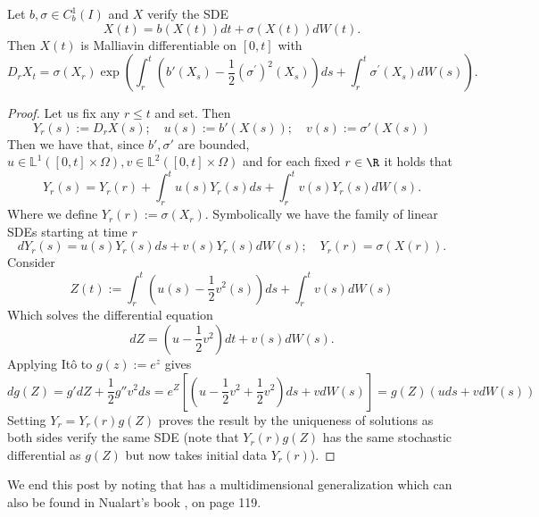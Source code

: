 \documentclass[
    a4paper,
    DIV=14,
    abstract=true,
    numbers=noenddot
]{scrartcl}
\begin{document}
\begin{theorem}
	Let $b,\sigma \in C^1_b(I)$ and $X$ verify  the SDE
	\begin{equation*}
		X(t)=b(X(t))d t +\sigma(X(t)) dW(t).
	\end{equation*}
	Then $X(t)$ is Malliavin differentiable on $[0,t]$ with
	\begin{equation*}
		D_r X_t=\sigma\left(X_r\right) \exp \left(\int_r^t\left(b'\left(X_s\right)-\frac{1}{2}\left(\sigma^{\prime}\right)^2\left(X_s\right)\right) d s+\int_r^t \sigma^{\prime}\left(X_s\right) d W(s)\right).
	\end{equation*}
	\begin{proof}
		Let us fix any $r\leq t$ and set. Then
		\begin{equation*}
			Y_r(s):=D_rX(s);\quad  u(s):=b'(X(s));\quad v(s):=\sigma'(X(s))
		\end{equation*}
		Then we have that, since $b',\sigma '$ are bounded, $u\in \mathbb{L}^1([0,t]\times\Omega),v\in \mathbb{L}^2([0,t]\times\Omega)$ and for each fixed $r\in  \R$ it holds that
		\begin{equation*}
			Y_r(s)=Y_r(r)+\int_{r}^t u(s)Y_r(s) ds+\int_{r}^t v(s)Y_r(s)  dW(s) .
		\end{equation*}
		Where we define $Y_r(r):=\sigma (X_r)$. Symbolically we have the family of linear SDEs starting at time $r$
		\begin{equation*}
			dY_r(s)=u(s)Y_r(s) ds+v(s)Y_r(s)  dW(s);\quad Y_r(r)=\sigma(X(r)).
		\end{equation*}
		Consider
		\begin{equation*}
			Z(t) := \int_r^t\left(u(s)-\frac{1}{2}v^2(s)\right) d s + \int_r^t v(s) d W(s)
		\end{equation*}
		Which solves the differential equation
		\begin{equation*}
			dZ=\left(u-\frac{1}{2}v^2\right)d t+v(s)dW(s) .
		\end{equation*}
		Applying Itô to  $g(z):=e^z$ gives
		\begin{equation*}
dg(Z) = g'dZ + \frac{1}{2}g''v^2 ds = e^Z\left[\left(u-\frac{1}{2}v^2+\frac{1}{2}v^2\right)ds + v dW(s)\right] = g(Z)(u ds + v dW(s))
		\end{equation*}
		Setting $Y_r=Y_r(r)g(Z)$ proves the result by the uniqueness of solutions as both sides verify the same SDE (note that  $Y_r(r)g(Z)$ has the same stochastic differential as $g(Z)$ but now takes initial data  $Y_r(r)$).
	\end{proof}
\end{theorem}
We end this post by noting that   has a multidimensional generalization which can also be found in Nualart's book \cite{nualart2018introduction}, on page 119.


\end{document}
